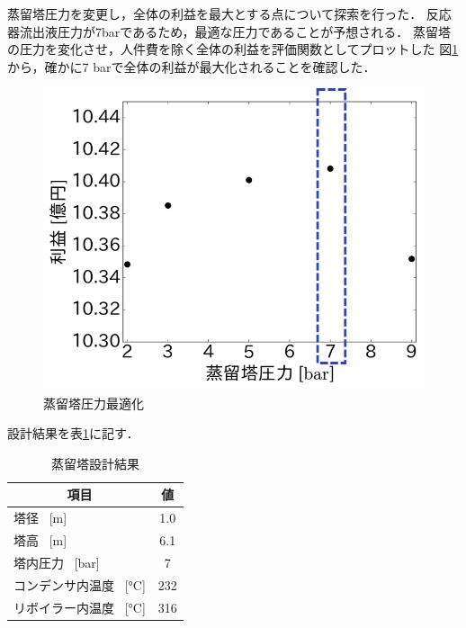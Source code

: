 \documentclass[a4j]{jsreport}
\begin{document}
蒸留塔圧力を変更し，全体の利益を最大とする点について探索を行った．
反応器流出液圧力が7barであるため，最適な圧力であることが予想される．
蒸留塔の圧力を変化させ，人件費を除く全体の利益を評価関数としてプロットした
図\ref{蒸留塔圧力最適化}から，確かに7 \si{\bar}で全体の利益が最大化されることを確認した．
\begin{figure}[htbp]
    \begin{center}
        \includegraphics[scale=0.7]{DistillationPressue.png}
        \caption{蒸留塔圧力最適化}
        \label{蒸留塔圧力最適化}
    \end{center}
\end{figure}

設計結果を表\ref{蒸留塔設計結果}に記す．
\begin{table}[htbp]
    \label{蒸留塔設計結果}
    \caption{蒸留塔設計結果}
    \begin{center}
        \begin{tabular}{lc}
            \hline
            \multicolumn{1}{c}{項目} & 値 \\
            \hline
            塔径 \, [\si{\metre}] & 1.0 \\
            塔高 \, [\si{\metre}] & 6.1 \\
            塔内圧力 \, [\si{\bar}] &7 \\
            コンデンサ内温度 \, [\si{\degreeCelsius}] & 232 \\
            リボイラー内温度 \, [\si{\degreeCelsius}] & 316 \\
            \hline
        \end{tabular}
    \end{center}
\end{table}
\end{document}
